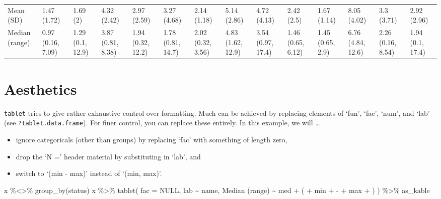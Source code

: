 \documentclass[
]{article}
\newenvironment{Shaded}{\begin{snugshade}}{\end{snugshade}}
\newcommand{\AttributeTok}[1]{\textcolor[rgb]{0.77,0.63,0.00}{#1}}
\newcommand{\ConstantTok}[1]{\textcolor[rgb]{0.00,0.00,0.00}{#1}}
\newcommand{\FunctionTok}[1]{\textcolor[rgb]{0.00,0.00,0.00}{#1}}
\newcommand{\NormalTok}[1]{#1}
\newcommand{\SpecialCharTok}[1]{\textcolor[rgb]{0.00,0.00,0.00}{#1}}
\newcommand{\StringTok}[1]{\textcolor[rgb]{0.31,0.60,0.02}{#1}}
\begin{document}
\begin{table}
{\begin{tabular}[t]{llllllllllllll}
\hspace{1em}Mean (SD) & 1.47 (1.72) & 1.69 (2) & 4.32 (2.42) & 2.97 (2.59) & 3.27 (4.68) & 2.14 (1.18) & 5.14 (2.86) & 4.72 (4.13) & 2.42 (2.5) & 1.67 (1.14) & 8.05 (4.02) & 3.3 (3.71) & 2.92 (2.96)\\
\hspace{1em}Median (range) & 0.97 (0.16, 7.09) & 1.29 (0.1, 12.9) & 3.87 (0.81, 8.38) & 1.94 (0.32, 12.2) & 1.78 (0.81, 14.7) & 2.02 (0.32, 3.56) & 4.83 (1.62, 12.9) & 3.54 (0.97, 17.4) & 1.46 (0.65, 6.12) & 1.45 (0.65, 2.9) & 6.76 (4.84, 12.6) & 2.26 (0.16, 8.54) & 1.94 (0.1, 17.4)\\
\bottomrule
\end{tabular}}
\end{table}

\hypertarget{aesthetics}{%
\section{Aesthetics}\label{aesthetics}}

\texttt{tablet} tries to give rather exhaustive control over formatting.
Much can be achieved by replacing elements of `fun', `fac', `num', and
`lab' (see \texttt{?tablet.data.frame}). For finer control, you can
replace these entirely. In this example, we will \ldots{}

\begin{itemize}
\item
  ignore categoricals (other than groups) by replacing `fac' with
  something of length zero,
\item
  drop the `N =' header material by substituting in `lab', and
\item
  switch to `(min - max)' instead of `(min, max)'.
\end{itemize}

\begin{Shaded}
\begin{Highlighting}[]
\NormalTok{x }\SpecialCharTok{\%\textless{}\textgreater{}\%} \FunctionTok{group\_by}\NormalTok{(status)}
\NormalTok{x }\SpecialCharTok{\%\textgreater{}\%} 
  \FunctionTok{tablet}\NormalTok{(}
    \AttributeTok{fac =} \ConstantTok{NULL}\NormalTok{,}
\NormalTok{    lab }\SpecialCharTok{\textasciitilde{}}\NormalTok{ name,}
    \StringTok{\textasciigrave{}}\AttributeTok{Median (range)}\StringTok{\textasciigrave{}} \SpecialCharTok{\textasciitilde{}}\NormalTok{ med }\SpecialCharTok{+} \StringTok{\textquotesingle{} (\textquotesingle{}} \SpecialCharTok{+}\NormalTok{ min }\SpecialCharTok{+} \StringTok{\textquotesingle{} {-} \textquotesingle{}} \SpecialCharTok{+}\NormalTok{ max }\SpecialCharTok{+} \StringTok{\textquotesingle{})\textquotesingle{}}
\NormalTok{  ) }\SpecialCharTok{\%\textgreater{}\%} 
\NormalTok{  as\_kable}
\end{Highlighting}
\end{Shaded}
\end{document}
